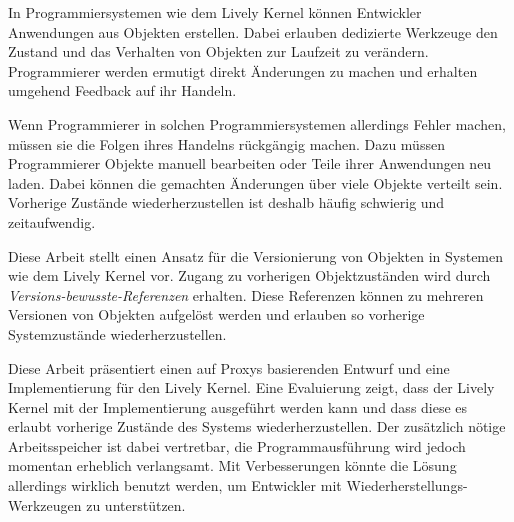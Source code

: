 \begin{zusammenfassung}

In Programmiersystemen wie dem Lively Kernel können Entwickler Anwendungen aus Objekten erstellen.
Dabei erlauben dedizierte Werkzeuge den Zustand und das Verhalten von Objekten zur Laufzeit zu verändern.
Programmierer werden ermutigt direkt Änderungen zu machen und erhalten umgehend Feedback auf ihr Handeln.

Wenn Programmierer in solchen Programmiersystemen allerdings Fehler machen, müssen sie die Folgen ihres Handelns rückgängig machen.
Dazu müssen Programmierer Objekte manuell bearbeiten oder Teile ihrer Anwendungen neu laden.
Dabei können die gemachten Änderungen über viele Objekte verteilt sein.
Vorherige Zustände wiederherzustellen ist deshalb häufig schwierig und zeitaufwendig.

Diese Arbeit stellt einen Ansatz für die Versionierung von Objekten in Systemen wie dem Lively Kernel vor.
Zugang zu vorherigen Objektzuständen wird durch \emph{Versions-bewusste-Referenzen} erhalten.
Diese Referenzen können zu mehreren Versionen von Objekten aufgelöst werden und erlauben so vorherige Systemzustände wiederherzustellen.

Diese Arbeit präsentiert einen auf Proxys basierenden Entwurf und eine Implementierung für den Lively Kernel.
Eine Evaluierung zeigt, dass der Lively Kernel mit der Implementierung ausgeführt werden kann und dass diese es erlaubt vorherige Zustände des Systems wiederherzustellen.
Der zusätzlich nötige Arbeitsspeicher ist dabei vertretbar, die Programmausführung wird jedoch momentan erheblich verlangsamt.
Mit Verbesserungen könnte die Lösung allerdings wirklich benutzt werden, um Entwickler mit Wiederherstellungs-Werkzeugen zu unterstützen.

\end{zusammenfassung}

